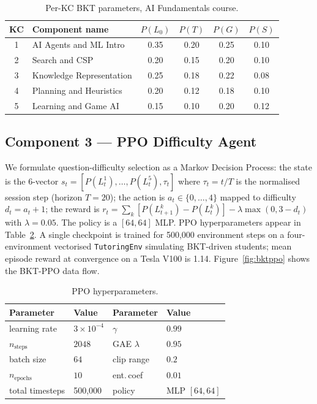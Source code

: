 \documentclass[conference]{IEEEtran}
\begin{document}
\begin{table}[H]
\caption{Per-KC BKT parameters, AI Fundamentals course.}
\label{tab:bkt}
\centering
\footnotesize
\setlength{\tabcolsep}{4pt}
\begin{tabular}{c l c c c c}
\toprule
KC & Component name & $P(L_0)$ & $P(T)$ & $P(G)$ & $P(S)$ \\
\midrule
1 & AI Agents and ML Intro    & 0.35 & 0.20 & 0.25 & 0.10 \\
2 & Search and CSP            & 0.20 & 0.15 & 0.20 & 0.10 \\
3 & Knowledge Representation  & 0.25 & 0.18 & 0.22 & 0.08 \\
4 & Planning and Heuristics   & 0.20 & 0.12 & 0.18 & 0.10 \\
5 & Learning and Game AI      & 0.15 & 0.10 & 0.20 & 0.12 \\
\bottomrule
\end{tabular}
\end{table}

\subsection{Component 3 --- PPO Difficulty Agent}
We formulate question-difficulty selection as a Markov Decision
Process: the state is the 6-vector $s_t = [P(L_t^1),\ldots,P(L_t^5),
\tau_t]$ where $\tau_t = t/T$ is the normalised session step (horizon
$T=20$); the action is $a_t\in\{0,\ldots,4\}$ mapped to difficulty
$d_t = a_t + 1$; the reward is
$r_t = \sum_k [P(L_{t+1}^k) - P(L_t^k)] - \lambda\max(0, 3-d_t)$ with
$\lambda=0.05$. The policy is a $[64,64]$ MLP. PPO hyperparameters
appear in Table~\ref{tab:ppo}. A single checkpoint is trained for
500{,}000 environment steps on a four-environment vectorised
\texttt{TutoringEnv} simulating BKT-driven students; mean episode
reward at convergence on a Tesla V100 is 1.14.
Figure~\ref{fig:bktppo} shows the BKT-PPO data flow.

\begin{table}[H]
\caption{PPO hyperparameters.}
\label{tab:ppo}
\centering
\footnotesize
\setlength{\tabcolsep}{6pt}
\begin{tabular}{l l l l}
\toprule
Parameter & Value & Parameter & Value \\
\midrule
learning rate           & $3{\times}10^{-4}$ & $\gamma$ & $0.99$ \\
$n_{\text{steps}}$      & $2048$ & GAE $\lambda$ & $0.95$ \\
batch size              & $64$ & clip range & $0.2$ \\
$n_{\text{epochs}}$     & $10$ & ent.\,coef & $0.01$ \\
total timesteps         & 500{,}000 & policy & MLP $[64,64]$ \\
\bottomrule
\end{tabular}
\end{table}
\end{document}
